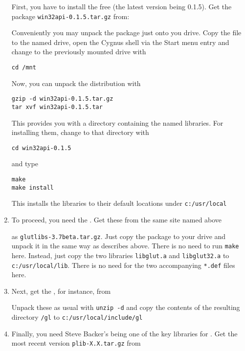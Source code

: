 \begin{enumerate}
 First, you have to install the free  (the latest
 version being 0.1.5). Get the package \texttt{win32api-0.1.5.tar.gz} from:


Conveniently you may unpack the package just onto you \FlightGear drive. Copy the file to
the named drive, open the Cygnus shell via the Start menu entry and change to the
previously mounted drive with

 \texttt{cd /mnt}

 Now, you can unpack the distribution with

 \texttt{gzip -d win32api-0.1.5.tar.gz}\\
 \texttt{tar xvf win32api-0.1.5.tar}

 This provides you with a directory containing the named libraries. For installing them,
 change to that directory with

\texttt{cd win32api-0.1.5}

and type

 \texttt{make}\\
 \texttt{make install}

This installs the libraries to their default locations under \texttt{c:/usr/local}

\item To proceed, you need the . Get these from the same site named
above


as \texttt{glutlibs-3.7beta.tar.gz}. Just copy the package to your \FlightGear drive and
unpack it in the same way as describes above. There is no need to run \texttt{make} here.
Instead, just copy the two libraries \texttt{libglut.a} and \texttt{libglut32.a} to
\texttt{c:/usr/local/lib}. There is no need for the two accompanying \texttt{*.def} files
here.

\item Next, get the , for instance, from


Unpack these as usual with \texttt{unzip -d} and copy the contents of the resulting
directory \texttt{/gl} to \texttt{c:/usr/local/include/gl}

\item Finally, you need Steve Backer's  being one of the key libraries for \FlightGear\hspace{-1mm}.
Get the most recent version \texttt{plib-X.X.tar.gz} from


\end{enumerate}
